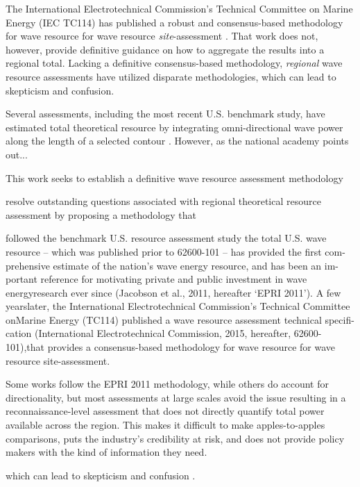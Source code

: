 The International Electrotechnical Commission's Technical Committee on
Marine Energy (IEC TC114) has published a robust and consensus-based methodology for wave resource for wave resource {\em site}-assessment \citep[][hereafter, 62600-101]{internationalelectrotechnicalcommissionPart101Wave2015}. That work does not, however, provide definitive guidance on how to aggregate the results into a regional total. Lacking a definitive consensus-based methodology, {\em regional} wave resource assessments have utilized disparate methodologies, which can lead to skepticism and confusion.

Several assessments, including the most recent U.S. benchmark study, have estimated total theoretical resource by integrating omni-directional wave power along the length of a selected contour \citep[]{}. However, as the national academy points out...



This work seeks to establish a definitive wave resource assessment methodology 

resolve outstanding questions associated with regional theoretical resource assessment by proposing a methodology that 

followed the benchmark U.S. resource assessment study the total U.S. wave resource -- which was published prior to 62600-101 -- has provided the first com-prehensive estimate of the nation’s wave energy resource, and has been an im-portant reference for motivating private and public investment in wave energyresearch ever since (Jacobson et al., 2011, hereafter ‘EPRI 2011’).  A few yearslater, the International Electrotechnical Commission’s Technical Committee onMarine Energy (TC114) published a wave resource assessment technical specifi-cation (International Electrotechnical Commission, 2015, hereafter, 62600-101),that  provides  a  consensus-based  methodology  for  wave  resource  for  wave  resource site-assessment.

Some works follow the EPRI 2011 methodology, while others do account for directionality, but most assessments at large scales avoid the issue resulting in a reconnaissance-level assessment that does not directly quantify total power available across the region. This makes it difficult to make apples-to-apples comparisons, puts the industry’s credibility at risk, and does not provide policy makers with the kind of information they need. 

which can lead to skepticism and confusion \citep[]{internationalelectrotechnicalcommissionPart101Wave2015, robertsonCharacterizingShoreWave2014, gunnQuantifyingGlobalWave2012, hughesNationalscaleWaveEnergy2010, hemerRevisedAssessmentAustralia2017, nationalresearchcouncilEvaluationDepartmentEnergy2013}.

